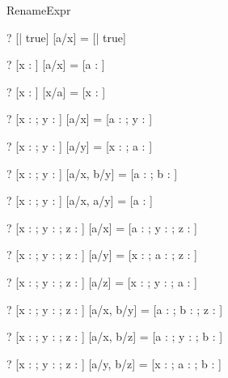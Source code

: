\begin{zsection}
  \SECTION RenameExpr
\end{zsection}

\begin{zed} \vdash? [| true] [a/x] = [| true] \end{zed}
\begin{zed} \vdash? [x : \nat] [a/x] = [a : \nat] \end{zed}
\begin{zed} \vdash? [x : \nat] [x/a] = [x : \nat] \end{zed}

\begin{zed}
  \vdash? [x : \nat; y : \nat] [a/x] = [a : \nat; y : \nat] 
\end{zed}
\begin{zed}
  \vdash? [x : \nat; y : \nat] [a/y] = [x : \nat; a : \nat] 
\end{zed}
\begin{zed}
  \vdash? [x : \nat; y : \nat] [a/x, b/y] = [a : \nat; b : \nat] 
\end{zed}
\begin{zed}
  \vdash? [x : \nat; y : \nat] [a/x, a/y] = [a : \nat] 
\end{zed}

\begin{zed}
  \vdash? [x : \nat; y : \nat; z : \power \nat] [a/x] = 
          [a : \nat; y : \nat; z : \power \nat] 
\end{zed}
\begin{zed}
  \vdash? [x : \nat; y : \nat; z : \power \nat] [a/y] = 
          [x : \nat; a : \nat; z : \power \nat] 
\end{zed}
\begin{zed}
  \vdash? [x : \nat; y : \nat; z : \power \nat] [a/z] = 
          [x : \nat; y : \nat; a : \power \nat] 
\end{zed}

\begin{zed}
  \vdash? [x : \nat; y : \nat; z : \power \nat] [a/x, b/y] = 
          [a : \nat; b : \nat; z : \power \nat] 
\end{zed}
\begin{zed}
  \vdash? [x : \nat; y : \nat; z : \power \nat] [a/x, b/z] = 
          [a : \nat; y : \nat; b : \power \nat] 
\end{zed}
\begin{zed}
  \vdash? [x : \nat; y : \nat; z : \power \nat] [a/y, b/z] = 
          [x : \nat; a : \nat; b : \power \nat] 
\end{zed}

